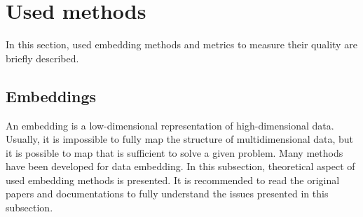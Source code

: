 \documentclass[12pt]{article}
\begin{document}
\clearpage
\section{Used methods}
In this section, used embedding methods and metrics to measure their quality are briefly described.
\subsection{Embeddings}
An embedding is a low-dimensional representation of high-dimensional data. Usually, it is impossible to fully map the structure of multidimensional data, but it is possible to map that is sufficient to solve a given problem. Many methods have been developed for data embedding. In this subsection, theoretical aspect of used embedding methods is presented. It is recommended to read the original papers and documentations to fully understand the issues presented in this subsection.
\end{document}
